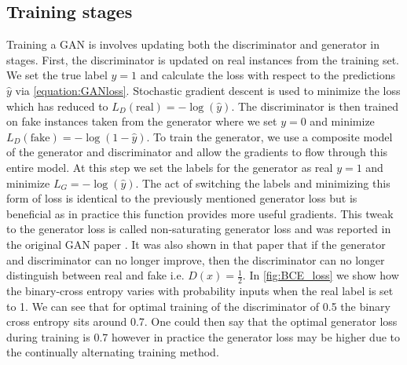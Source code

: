 \documentclass[12pt]{iopart}
\begin{document}
\subsection{Training stages}
%
Training a GAN is involves updating both the discriminator and generator in stages. First, the discriminator is updated on real instances from the training set. We set the true label $y=1$ and calculate the loss with respect to the predictions $\hat{y}$ via \cref{equation:GANloss}. Stochastic gradient descent is used to minimize the loss which has reduced to $L_D(\textrm{real}) = -\log(\hat{y})$. The discriminator is then trained on fake instances taken from the generator where we set $y=0$ and minimize $L_D(\textrm{fake}) = -\log(1-\hat{y})$. To train the generator, we use a composite model of the generator and discriminator and allow the gradients to flow through this entire model. At this step we set the labels for the generator as real $y=1$ and minimize $L_G = -\log(\hat{y})$. The act of switching the labels and minimizing this form of loss is identical to the previously mentioned generator loss but is beneficial as in practice this function provides more useful gradients. This tweak to the generator loss is called non-saturating generator loss and was reported in the original GAN paper \cite{Goodfellow2014}. It was also shown in that paper that if the generator and discriminator can no longer improve, then the discriminator can no longer distinguish between real and fake i.e. $D(x) = \frac{1}{2}$. In \cref{fig:BCE_loss} we show how the binary-cross entropy varies with probability inputs when the real label is set to 1. We can see that for optimal training of the discriminator of 0.5 the binary cross entropy sits around 0.7. One could then say that the optimal generator loss during training is 0.7 however in practice the generator loss may be higher due to the continually alternating training method.
\end{document}
